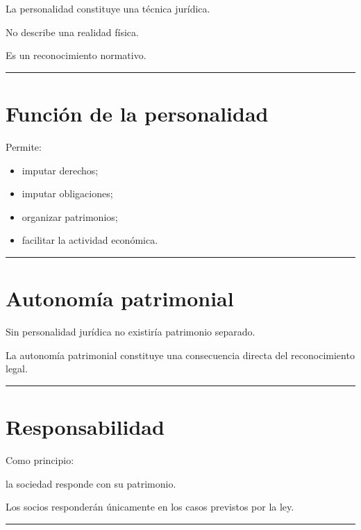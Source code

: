 \documentclass[
  spanish,
  letterpaper,
  DIV=11,
  numbers=noendperiod]{scrartcl}
\providecommand{\tightlist}{%
  \setlength{\itemsep}{0pt}\setlength{\parskip}{0pt}}
\begin{document}
La personalidad constituye una técnica jurídica.

No describe una realidad física.

Es un reconocimiento normativo.

\begin{center}\rule{0.5\linewidth}{0.5pt}\end{center}

\section{Función de la
personalidad}\label{funciuxf3n-de-la-personalidad}

Permite:

\begin{itemize}
\tightlist
\item
  imputar derechos;
\item
  imputar obligaciones;
\item
  organizar patrimonios;
\item
  facilitar la actividad económica.
\end{itemize}

\begin{center}\rule{0.5\linewidth}{0.5pt}\end{center}

\section{Autonomía patrimonial}\label{autonomuxeda-patrimonial}

Sin personalidad jurídica no existiría patrimonio separado.

La autonomía patrimonial constituye una consecuencia directa del
reconocimiento legal.

\begin{center}\rule{0.5\linewidth}{0.5pt}\end{center}

\section{Responsabilidad}\label{responsabilidad}

Como principio:

la sociedad responde con su patrimonio.

Los socios responderán únicamente en los casos previstos por la ley.

\begin{center}\rule{0.5\linewidth}{0.5pt}\end{center}
\end{document}
